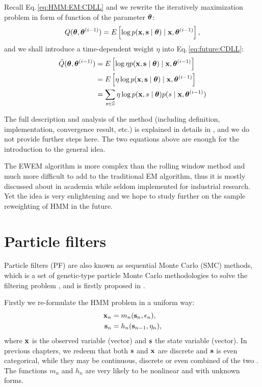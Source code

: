 Recall Eq.\,\ref{eq:HMM:EM:CDLL} and we rewrite the iteratively maximization problem
in form of function of the parameter ${\boldsymbol\theta}$:
		\begin{equation}
		\label{eq:future:CDLL}
		Q({\boldsymbol\theta},{\boldsymbol\theta}^{(i-1)}) = E \left[ \log p({\mathbf x},{\mathbf s} \mid {\boldsymbol\theta})
			\mid {\mathbf x},{\boldsymbol\theta}^{(i-1)} \right],
		\end{equation}
and we shall introduce a time-dependent weight $\eta$ into Eq.\,\ref{eq:future:CDLL}:
		\begin{equation}
		\label{eq:future:CDLL:time}
		\begin{aligned}
		\hat{Q}({\boldsymbol\theta},{\boldsymbol\theta}^{(i-1)}) & = E\left[\log\eta p({\mathbf x},{\mathbf s} \mid {\boldsymbol\theta}) 
			\mid {\mathbf x},{\boldsymbol\theta}^{(i-1)} \right] \\
		& = E\left[\eta\log p({\mathbf x},{\mathbf s} \mid {\boldsymbol\theta}) \mid {\mathbf x},{\boldsymbol\theta}^{(i-1)} \right] \\
		& = \sum_{s \in {\mathbb S}}\eta\log p({\mathbf x},s \mid {\boldsymbol\theta}) p(s \mid {\mathbf x},{\boldsymbol\theta}^{(i-1)})
		\end{aligned}
		\end{equation}

The full description and analysis of the method 
(including definition, implementation, convergence result, etc.)
is explained in details in \cite{Zhang:2005tp},
and we do not provide further steps here.
The two equations above are enough for the introduction to the general idea.

The EWEM algorithm is more complex than the rolling window method and 
much more difficult to add to the traditional EM algorithm,
thus it is mostly discussed about in academia while seldom implemented for industrial research.
Yet the idea is very enlightening and 
we hope to study further on the sample reweighting of HMM in the future.


\section{Particle filters}
\label{sec:future:PF}
Particle filters (PF) are also known as sequential Monte Carlo (SMC) methods,
which is a set of genetic-type particle Monte Carlo methodologies 
to solve the filtering problem \cite{wiki:PF},
and is firstly proposed in \cite{DelMoral:1997dp, Liu:1998fp}.

Firstly we re-formulate the HMM problem in a uniform way:
		\begin{subequations}
		\begin{align}
		{\mathbf x}_n & = m_n({\mathbf s}_n,\epsilon_n), \\
		{\mathbf s}_n & = h_n({\mathbf s}_{n-1},\eta_n),
		\end{align}
		\end{subequations}
where ${\mathbf x}$ is the observed variable (vector) and ${\mathbf s}$ the state variable (vector).
In previous chapters,
we redeem that both ${\mathbf s}$ and ${\mathbf x}$ are discrete and ${\mathbf s}$ is even categorical,
while they may be continuous, discrete or even combined of the two \cite{Creal:2012ct}.
The functions $m_n$ and $h_n$ are very likely to be nonlinear and with unknown forms.

